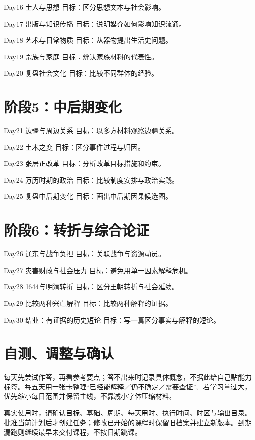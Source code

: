 \documentclass[11pt]{article}
\newcommand{\Needspace}[1]{\par\ifdim\dimexpr\pagegoal-\pagetotal\relax<#1\relax\newpage\fi}
\begin{document}
Day16  士人与思想
目标：区分思想文本与社会影响。

Day17  出版与知识传播
目标：说明媒介如何影响知识流通。

Day18  艺术与日常物质
目标：从器物提出生活史问题。

Day19  宗族与家庭
目标：辨认家族材料的代表性。

Day20  复盘社会文化
目标：比较不同群体的经验。

\Needspace{5\baselineskip}\section*{阶段5：中后期变化}

Day21  边疆与周边关系
目标：以多方材料观察边疆关系。

Day22  土木之变
目标：区分事件过程与归因。

Day23  张居正改革
目标：分析改革目标措施和约束。

Day24  万历时期的政治
目标：比较制度安排与政治实践。

Day25  复盘中后期变化
目标：画出中后期因果候选图。

\Needspace{5\baselineskip}\section*{阶段6：转折与综合论证}

Day26  辽东与战争负担
目标：关联战争与资源动员。

Day27  灾害财政与社会压力
目标：避免用单一因素解释危机。

Day28  1644与明清转折
目标：区分王朝转折与社会延续。

Day29  比较两种兴亡解释
目标：比较两种解释的证据。

Day30  结业：有证据的历史短论
目标：写一篇区分事实与解释的短论。

\Needspace{5\baselineskip}\section*{自测、调整与确认}

每天先尝试作答，再看参考要点；答不出来时记录具体概念，不据此给自己贴能力标签。每五天用一张卡整理“已经能解释／仍不确定／需要查证”。若学习量过大，优先缩小每日范围并保留主线，不靠减小字体压缩材料。

真实使用时，请确认目标、基础、周期、每天用时、执行时间、时区与输出目录。批准当前计划后才创建任务；修改已开始的课程时保留旧档案并建立新版本。到期漏跑则继续最早未交付课程，不按日期跳课。
\end{document}
